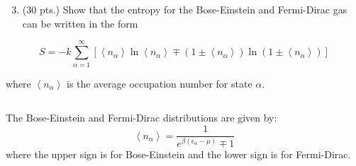 \documentclass[10pt]{article}
\begin{document}
\section{}
\begin{enumerate}
  \setcounter{enumi}{2}
  \item (30 pts.) Show that the entropy for the Bose-Einstein and Fermi-Dirac gas can be written in the form
\end{enumerate}

$$
S=-k \sum_{\alpha=1}^{\infty}\left[\left\langle n_{\alpha}\right\rangle \ln \left\langle n_{\alpha}\right\rangle \mp\left(1 \pm\left\langle n_{\alpha}\right\rangle\right) \ln \left(1 \pm\left\langle n_{\alpha}\right\rangle\right)\right]
$$

where $\left\langle n_{\alpha}\right\rangle$ is the average occupation number for state $\alpha$.
\subsection{}
The Bose-Einstein and Fermi-Dirac distributions are given by:
\begin{equation}
  \left\langle n_{\alpha}\right\rangle=\frac{1}{e^{\beta\left(\epsilon_{\alpha}-\mu\right)}\mp 1}
\end{equation}
where the upper sign is for Bose-Einstein and the lower sign is for Fermi-Dirac.
\end{document}
